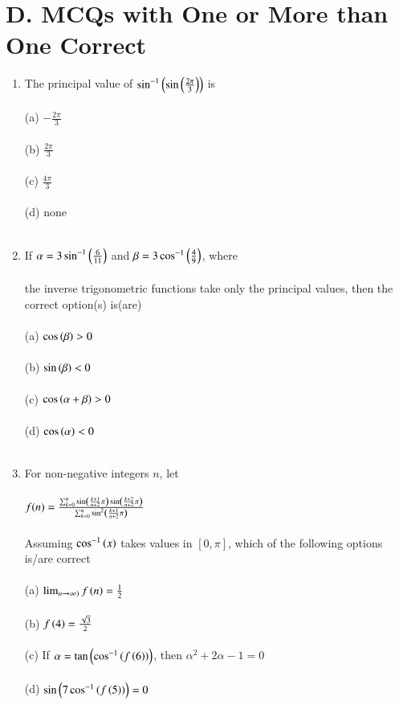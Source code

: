 \documentclass[journal,12pt,twocolumn]{IEEEtran}
\theoremstyle{remark}
\begin{document}
\section*{D. MCQs with One or More than One Correct}
\begin{enumerate}
\item The principal value of $\sin ^{-1}\left(\sin \left(\frac{2\pi}{3}\right)\right)$ is
\hfill {}\\\\
(a) $-\frac{2\pi}{3}$ \\\\(b) $\frac{2\pi}{3}$ \\\\(c) $\frac{4\pi}{3}$ \\\\(d) none\\\\
\item If $\alpha=3\sin ^{-1}\left(\frac{6}{11}\right)$ and $\beta=3\cos ^{-1}\left(\frac{4}{9}\right)$, where\\\\ the inverse trigonometric functions take only the principal values, then the correct option(s) is(are)
\hfill {}\\\\
(a) $\cos \left(\beta\right)>0$ \\\\(b) $\sin \left(\beta\right)<0$\\\\
(c) $\cos \left(\alpha + \beta\right) > 0$ \\\\(d) $\cos \left(\alpha\right)<0$\\\\
\item For non-negative integers $n$, let \\\\
$f(n)= \frac{\sum_{k=0}^{n} \sin \left(\frac{k+1}{n+2}\pi\right)\sin \left(\frac{k+2}{n+2}\pi\right)}{\sum_{k=0}^{n} \sin ^2 \left(\frac{k+1}{n+2}\pi\right)}$\\\\
Assuming $\cos ^{-1}\left(x\right)$ takes values in $[0,\pi]$, which of the following options is/are correct
\hfill {}\\\\
(a) $\lim_{n \rightarrow \infty)} f\left(n\right) = \frac{1}{2}$\\\\ 
(b) $f\left(4\right)=\frac{\sqrt{3}}{2}$\\\\
(c) If $\alpha = \tan \left(\cos ^{-1}\left(f\left(6\right)\right)\right)$, then $\alpha ^2 + 2\alpha -1 =0$\\\\
(d) $\sin \left(7\cos ^{-1}\left(f\left(5\right)\right)\right)=0$
\end{enumerate}
\end{document}
